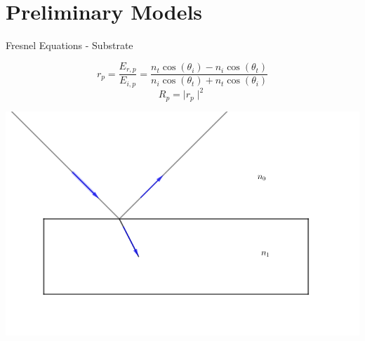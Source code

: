 \documentclass[10pt]{beamer}
\begin{document}
	
	
	
	\section{Preliminary Models}
	
	\begin{frame}{Fresnel Equations - Substrate}
	
	\begin{minipage}{0.47\textwidth}
	\begin{equation*}
	r_p = \frac{E_{r,p}}{E_{i,p}} = \frac{n_t\cos(\theta_i)-n_i\cos(\theta_t)}{n_i\cos(\theta_t)+n_t\cos(\theta_i)}
	\end{equation*}
	\begin{equation*}
	R_p = \mid r_p \mid ^2 
	\end{equation*}
	\end{minipage}
	\begin{minipage}{0.5\textwidth}
	\includegraphics[scale=0.2]{subrefl.png}
	\end{minipage}
	\end{frame}
	
\end{document}
